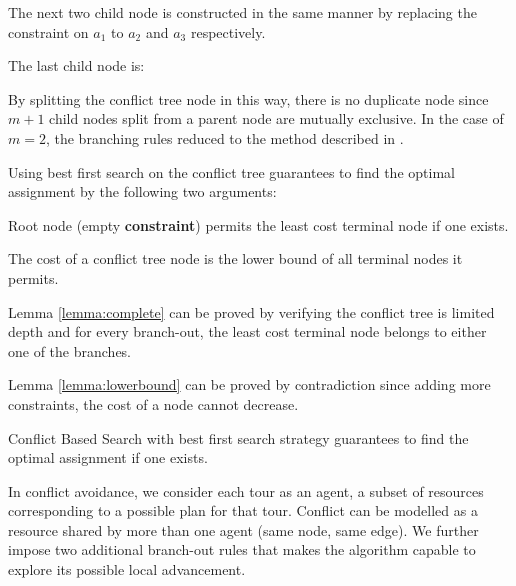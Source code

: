The next two child node is constructed in the same manner by replacing the constraint on $a_1$ to $a_2$ and $a_3$ respectively.
    
The last child node is:
    
    
By splitting the conflict tree node in this way, there is no duplicate node since $m+1$ child nodes split from a parent node are mutually exclusive. In the case of $m=2$, the branching rules reduced to the method described in \cite{sharon2015conflict}.
    
Using best first search on the conflict tree guarantees to find the optimal assignment by the following two arguments:
    
\begin{lemma}[Complete]
Root node (empty \textbf{constraint}) permits the least cost terminal node if one exists.
\label{lemma:complete}
\end{lemma}
    
\begin{lemma}
The cost of a conflict tree node is the lower bound of all terminal nodes it permits.
\label{lemma:lowerbound}
\end{lemma}
    
Lemma \ref{lemma:complete} can be proved by verifying the conflict tree is limited depth and for every branch-out, the least cost terminal node belongs to either one of the branches.
    
Lemma \ref{lemma:lowerbound} can be proved by contradiction since adding more constraints, the cost of a node cannot decrease.

\begin{theorem}
Conflict Based Search with best first search strategy guarantees to find the optimal assignment if one exists.
\end{theorem}

In conflict avoidance, we consider each tour as an agent, a subset of resources corresponding to a possible plan for that tour. Conflict can be modelled as a resource shared by more than one agent (same node, same edge). We further impose two additional branch-out rules that makes the algorithm capable to  explore its possible local advancement.

